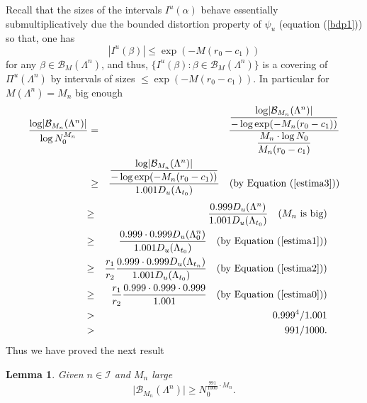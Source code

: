 \documentclass[12pt]{amsart}
\providecommand{\abs}[1]{\lvert#1\rvert}
\theoremstyle{plain} %
\newtheorem{lemma}[theorem]{Lemma}
\theoremstyle{definition} %
\numberwithin{equation}{section}
\begin{document}
Recall that the sizes of the intervals $I^u(\alpha)$ behave essentially submultiplicatively due the bounded distortion property of $\psi_u$ (equation (\ref{bdp1})) so that, one has   
$$|I^u(\beta)|\leq \exp(-M(r_0-c_1))$$
for any $\beta\in\mathcal{B}_M(\Lambda^n)$, and thus, $\{I^u(\beta):\beta\in \mathcal{B}_M(\Lambda^n)\}$ is a covering of $\Pi^u(\Lambda^n)$ by intervals of sizes $\leq \exp(-M(r_0-c_1))$. In particular for $M(\Lambda^n)=M_n$ big enough
\begin{eqnarray*}
\dfrac{\log\abs{\mathcal{B}_{M_n}(\Lambda^n)}}{\log N_0^{M_n}}&=&\dfrac{\dfrac{\log\abs{\mathcal{B}_{M_n}(\Lambda^n)}}{-\log \exp (-M_n (r_0-c_1))}}{\dfrac{M_n\cdot \log N_0}{M_n(r_0-c_1)}}\\ &\geq& \frac{\dfrac{\log\abs{\mathcal{B}_{M_n}(\Lambda^n)}}{-\log \exp (-M_n (r_0-c_1))}}{1.001 D_u(\Lambda_{t_0})} \quad (\textrm{by Equation (\ref{estima3})}) \\
\end{eqnarray*}
\begin{eqnarray*}
 \ \ \ \ \ \ \ \ \ \ \ \ \ &\geq& \frac{0.999D_u(\Lambda^n)}{1.001 D_u(\Lambda_{t_0})} \quad (\textrm{$M_n$ is big}) \\ &\geq&\ \dfrac{0.999\cdot0.999D_u(\Lambda_0^n)}{1.001 D_u(\Lambda_{t_0})}\quad (\textrm{by Equation (\ref{estima1})})\\&\geq& \dfrac{r_1}{r_2}\dfrac{0.999\cdot0.999D_u(\Lambda_{t_n})}{1.001 D_u(\Lambda_{t_0})}\quad (\textrm{by Equation (\ref{estima2})})\\ &\geq& \dfrac{r_1}{r_2}\dfrac{0.999\cdot0.999\cdot0.999}{1.001}\quad (\textrm{by Equation (\ref{estima0})})\\&>& 0.999^4/1.001 \\&>& 991/1000.
\end{eqnarray*}
Thus we have proved the next result 
\begin{lemma}\label{Btam}
Given $n\in \mathcal{I}$ and $M_n$ large 
$$ \abs{\mathcal{B}_{M_n}(\Lambda^n)}\geq N_0^{\frac{991}{1000}\cdot M_n}.$$
\end{lemma}
\end{document}
